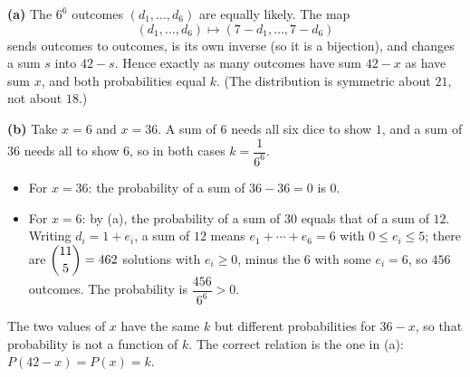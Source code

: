 \textbf{(a)} The $6^6$ outcomes $(d_1,\dots,d_6)$ are equally likely. The map
\[(d_1,\dots,d_6)\mapsto(7-d_1,\dots,7-d_6)\]
sends outcomes to outcomes, is its own inverse (so it is a bijection), and changes a sum $s$ into $42-s$. Hence exactly as many outcomes have sum $42-x$ as have sum $x$, and both probabilities equal $k$. (The distribution is symmetric about $21$, not about $18$.)

\textbf{(b)} Take $x=6$ and $x=36$. A sum of $6$ needs all six dice to show $1$, and a sum of $36$ needs all to show $6$, so in both cases $k=\dfrac{1}{6^6}$.
\begin{itemize}
\item For $x=36$: the probability of a sum of $36-36=0$ is $0$.
\item For $x=6$: by (a), the probability of a sum of $30$ equals that of a sum of $12$. Writing $d_i=1+e_i$, a sum of $12$ means $e_1+\cdots+e_6=6$ with $0\le e_i\le5$; there are $\dbinom{11}{5}=462$ solutions with $e_i\ge0$, minus the $6$ with some $e_i=6$, so $456$ outcomes. The probability is $\dfrac{456}{6^6}>0$.
\end{itemize}
The two values of $x$ have the same $k$ but different probabilities for $36-x$, so that probability is not a function of $k$. The correct relation is the one in (a): $P(42-x)=P(x)=k$.
